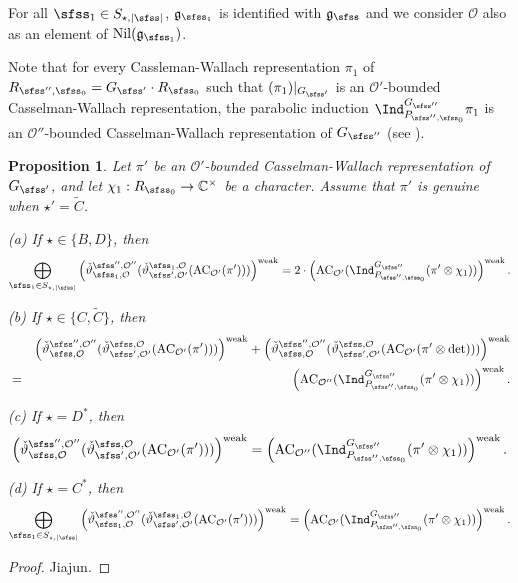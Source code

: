\documentclass[12pt,a4paper]{amsart}
\def\abs#1{\left|{#1}\right|}
\newcommand{\CO}{{\mathcal {O}}}
\newcommand{\g}{\mathfrak g}
\numberwithin{equation}{section}
\newtheorem{prop}[thm]{Proposition}
\theoremstyle{remark}
\begin{document}
For all $\sfss_1\in S_{\star, \abs{\sfss}}$,  $\g_{\sfss_1}$ is identified with $\g_{\sfss}$ and we consider $\CO$ also as an element of $\mathrm{Nil}(\g_{\sfss_1})$. 


Note that for every Cassleman-Wallach representation $\pi_1$ of $R_{\sfss'',\sfss_0}=G_{\sfss'}\cdot R_{\sfss_0}$ such that $(\pi_1)|_{G_{\sfss'}}$ is an $\CO'$-bounded Casselman-Wallach representation,   the parabolic induction
$\Ind_{P_{\sfss'',\sfss_0}}^{G_{\sfss''}} \pi_1$ is an $\CO''$-bounded Casselman-Wallach representation  of $G_{\sfss''}$ (see \cite[Corollary~5.0.10]{B.Orbit}).




\begin{prop}\label{prpaseq}
Let   $\pi'$ be an $\CO'$-bounded Casselman-Wallach representation of $G_{\sfss'}$, and let $\chi_1: R_{\sfss_0}\rightarrow \C^\times$ be a character. 
Assume that $\pi'$ is genuine when $\star'=\widetilde C$. 

\noindent
(a) If $ \star\in \{B,D\}$,  then
\[
    \bigoplus_{\sfss_1\in S_{\star, \abs{\sfss}}}  \left(\check \vartheta^{\sfss'', \CO''}_{\sfss_1, \CO}(\check \vartheta^{\sfss_1, \CO}_{\sfss',\CO'}(\mathrm{AC}_{\CO'}(\pi')))\right)^{\mathrm{weak}}=2\cdot \left( \mathrm{AC}_{\CO'}(\Ind_{P_{\sfss'',\sfss_0}}^{G_{\sfss''}} (\pi'\otimes \chi_1))\right)^{\mathrm{weak}}.
        \]

  \smallskip
  

    \noindent
(b) If $\star \in \{C, \widetilde C\}$, then
\begin{eqnarray*}
   && \left(\check \vartheta^{\sfss'', \CO''}_{\sfss, \CO}(\check \vartheta^{\sfss, \CO}_{\sfss',\CO'}(\mathrm{AC}_{\CO'}(\pi')))\right)^{\mathrm{weak}} +  \left(\check \vartheta^{\sfss'', \CO''}_{\sfss, \CO}(\check \vartheta^{\sfss, \CO}_{\sfss',\CO'}(\mathrm{AC}_{\CO'}(\pi'\otimes \det )))\right)^{\mathrm{weak}}\\
   & =&\left( \mathrm{AC}_{\CO''}(\Ind_{P_{\sfss'',\sfss_0}}^{G_{\sfss''}} (\pi'\otimes \chi_1))\right)^{\mathrm{weak}}. 
\end{eqnarray*}
  \smallskip

\noindent
(c) If $\star=D^*$, then
\[
 \left(\check \vartheta^{\sfss'', \CO''}_{\sfss, \CO}(\check \vartheta^{\sfss, \CO}_{\sfss',\CO'}(\mathrm{AC}_{\CO'}(\pi')))\right)^{\mathrm{weak}} = \left( \mathrm{AC}_{\CO''}(\Ind_{P_{\sfss'',\sfss_0}}^{G_{\sfss''}} (\pi'\otimes \chi_1))\right)^{\mathrm{weak}}.
 \]
 
\smallskip

\noindent
(d) If $\star=C^*$, then 
\[
  \bigoplus_{\sfss_1\in S_{\star, \abs{\sfss}} } \left(\check \vartheta^{\sfss'', \CO''}_{\sfss_1, \CO}(\check \vartheta^{\sfss_1, \CO}_{\sfss',\CO'}(\mathrm{AC}_{\CO'}(\pi')))\right)^{\mathrm{weak}}=\left( \mathrm{AC}_{\CO'}(\Ind_{P_{\sfss'',\sfss_0}}^{G_{\sfss''}} (\pi'\otimes \chi_1))\right)^{\mathrm{weak}}.
\]
\end{prop}
\begin{proof}
Jiajun.
\end{proof}
\end{document}
